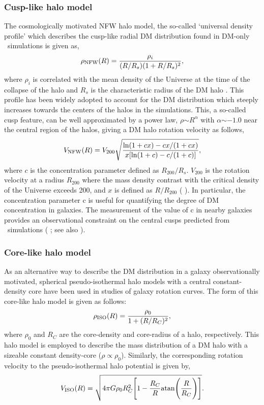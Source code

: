 \documentclass[natbib209]{emulateapj}
\begin{document}
\subsubsection{Cusp-like halo model} \label{CUSP_MODEL}
The cosmologically motivated NFW halo model, the so-called `universal density
profile' which describes the cusp-like radial DM distribution found in
DM-only \LCDM\ simulations is given as, 
\begin{equation}
\label{eq:6}
\rho_{\rm{NFW}}(R) = \frac{\rho_{i}}{(R/R_{s})(1+R/R_{s})^{2}},
\end{equation}
where $\rho_{i}$ is correlated with the mean density of the Universe at the time
of the collapse of the halo and $R_{s}$ is the characteristic radius of the DM
halo \citep{NFW_1996}. This profile has been widely adopted to account for the DM distribution
which steeply increases towards the centers of the halos in the simulations.
This, a so-called cusp feature, can be well approximated by a power law,
$\rho$$\sim$$R^{\alpha}$ with $\alpha$$\sim$$-1.0$ near the central region of
the halos, giving a DM halo
rotation velocity as follows,
\begin{equation}
\label{eq:7}
V_{\rm{NFW}}(R) =
V_{200}\sqrt{\frac{{\rm{ln}}(1+cx)-cx/(1+cx)}{x[{\rm{ln}}(1+c)-c/(1+c)]}},
\end{equation}
where $c$ is the concentration parameter defined as $R_{200}/R_{s}$. $V_{200}$ is the
rotation velocity at a radius $R_{200}$ where the mass density contrast with the critical density of the Universe exceeds 200,
and $x$ is defined as $R/R_{200}$ (\citeauthor{NFW_1996} \citeyear{NFW_1996}). In particular, the concentration
parameter c is useful for quantifying the degree of DM concentration in
galaxies. The measurement of the value of c in nearby galaxies provides an
observational constraint on the central cusps predicted from \LCDM\ simulations
(\citeauthor{McGaugh_2007} \citeyear{McGaugh_2007}; see also
\citeauthor{deBlok_2003} \citeyear{deBlok_2003}).


\subsubsection{Core-like halo model} \label{CORE_MODEL}
As an alternative way to describe the DM distribution in a galaxy observationally motivated,
spherical pseudo-isothermal halo models with a central constant-density core have been
used in studies of galaxy rotation curves. The
form of this core-like halo model is given as follows:
\begin{equation}
\label{eq:8}
\rho_{\rm{ISO}}(R) = \frac{\rho_{0}}{1+(R/R_C)^{2}},
\end{equation}
where $\rho_{0}$ and $R_C$ are the core-density and core-radius of a halo, respectively.
This halo model is employed to describe the mass distribution of a DM 
halo with a sizeable constant density-core ($\rho$$\propto$$\rho_{0}$). 
Similarly, the corresponding rotation velocity to the pseudo-isothermal halo
potential is given by,
\begin{equation}
\label{eq:9}
V_{\rm{ISO}}(R) = \sqrt{4\pi
G\rho_{0}R_C^{2}\Biggl[1-\frac{R_C}{R}{\rm{atan}}\Biggl(\frac{R}{R_C}\Biggr)\Biggr]}.
\end{equation}
\end{document}
